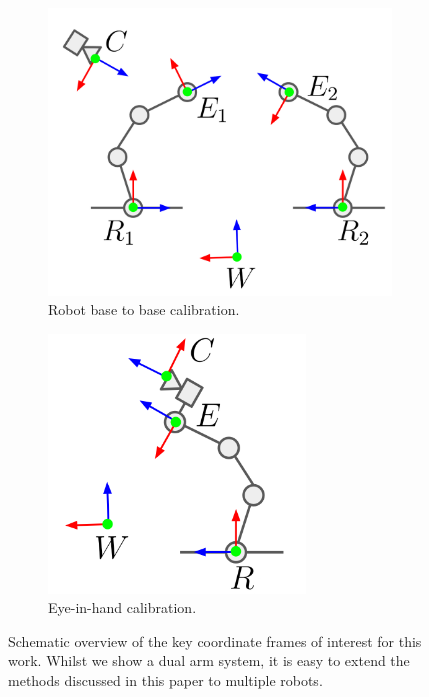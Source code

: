\begin{figure}[t]
     \centering
     \begin{subfigure}[b]{0.45\textwidth}
         \centering
         \includegraphics[width=\textwidth]{img/base2base.png}
         \caption{Robot base to base calibration.}
         \label{c1:fig:base2base}
     \end{subfigure}
     \hfill
     \begin{subfigure}[b]{0.45\textwidth}
         \centering
         \includegraphics[width=0.75\textwidth]{img/eyeinhand.png}
         \caption{Eye-in-hand calibration.}
         \label{c1:fig:eyeinhand}
     \end{subfigure}
     
    \caption{
    Schematic overview of the key coordinate frames of interest for this work.
    Whilst we show a dual arm system, it is easy to extend the methods discussed in this paper to multiple robots.
    }
    \label{c1:fig:schematic}
\end{figure}

